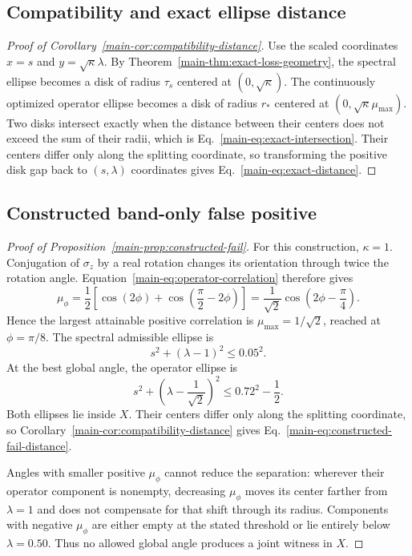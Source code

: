 \documentclass[11pt]{article}
\begin{document}
\subsection{Compatibility and exact ellipse distance}
\begin{proof}[Proof of Corollary~\ref{main-cor:compatibility-distance}]
Use the scaled coordinates $x=s$ and $y=\sqrt{\kappa}\lambda$. By
Theorem~\ref{main-thm:exact-loss-geometry}, the spectral ellipse becomes a disk of radius
$\tau_s$ centered at $(0,\sqrt{\kappa})$. The continuously optimized operator ellipse
becomes a disk of radius $r_*$ centered at
$(0,\sqrt{\kappa}\mu_{\max})$. Two disks intersect exactly when the distance between
their centers does not exceed the sum of their radii, which is
Eq.~\eqref{main-eq:exact-intersection}. Their centers differ only along the splitting
coordinate, so transforming the positive disk gap back to $(s,\lambda)$ coordinates
gives Eq.~\eqref{main-eq:exact-distance}.
\end{proof}

\subsection{Constructed band-only false positive}
\begin{proof}[Proof of Proposition~\ref{main-prop:constructed-fail}]
For this construction, $\kappa=1$. Conjugation of $\sigma_z$ by a real rotation changes
its orientation through twice the rotation angle. Equation~\eqref{main-eq:operator-correlation}
therefore gives
\[
 \mu_\phi
 =\frac12\left[\cos(2\phi)+\cos\left(\frac\pi2-2\phi\right)\right]
 =\frac{1}{\sqrt2}\cos\left(2\phi-\frac\pi4\right).
\]
Hence the largest attainable positive correlation is
$\mu_{\max}=1/\sqrt2$, reached at $\phi=\pi/8$. The spectral admissible ellipse is
\[
 s^2+(\lambda-1)^2\le0.05^2.
\]
At the best global angle, the operator ellipse is
\[
 s^2+\left(\lambda-\frac1{\sqrt2}\right)^2
 \le 0.72^2-\frac12.
\]
Both ellipses lie inside $X$. Their centers differ only along the splitting coordinate,
so Corollary~\ref{main-cor:compatibility-distance} gives
Eq.~\eqref{main-eq:constructed-fail-distance}.

Angles with smaller positive $\mu_\phi$ cannot reduce the separation: wherever their
operator component is nonempty, decreasing $\mu_\phi$ moves its center farther from
$\lambda=1$ and does not compensate for that shift through its radius. Components with
negative $\mu_\phi$ are either empty at the stated threshold or lie entirely below
$\lambda=0.50$. Thus no allowed global angle produces a joint witness in $X$.
\end{proof}
\end{document}
